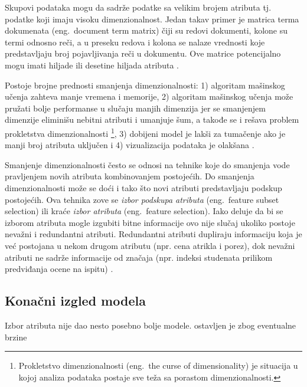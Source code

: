 \documentclass[12pt,oneside]{memoir}
\begin{document}
Skupovi podataka mogu da sadrže podatke sa velikim brojem atributa tj. podatke koji imaju visoku dimenzionalnost. Jedan takav primer je matrica terma dokumenata (eng.~document term matrix) čiji su redovi dokumenti, kolone su termi odnosno reči, a u preseku redova i kolona se nalaze vrednosti koje predstavljaju broj pojavljivanja reči u dokumentu. Ove matrice potencijalno mogu imati hiljade ili desetine hiljada atributa \cite{mitic}. 

Postoje brojne prednosti smanjenja dimenzionalnosti: 1)  algoritam mašinskog učenja zahteva manje vremena i memorije, 2) algoritam mašinskog učenja može pružati bolje performanse u slučaju manjih dimenzija jer se smanjenjem dimenzije eliminišu nebitni atributi i umanjuje šum, a takođe se i rešava problem prokletstva dimenzionalnosti \footnote{Prokletstvo dimenzionalnosti (eng.~the curse of dimensionality) je situacija u kojoj analiza podataka postaje sve teža sa porastom dimenzionalnosti.}, 3) dobijeni model je lakši za tumačenje ako je manji broj atributa uključen i 4) vizualizacija podataka je olakšana \cite{mitic}.

Smanjenje dimenzionalnosti često se odnosi na tehnike koje do smanjenja vode pravljenjem novih atributa kombinovanjem postojećih. Do smanjenja dimenzionalnosti može se doći i tako što novi atributi predstavljaju podskup postojećih. Ova tehnika zove se \textit{izbor podskupa atributa} (eng.~feature subset selection) ili kraće \textit{izbor atributa} (eng.~feature selection). Iako deluje da bi se izborom atributa mogle izgubiti bitne informacije ovo nije slučaj ukoliko postoje nevažni i redundantni atributi. Redundantni atributi dupliraju informaciju koja je već postojana u nekom drugom atributu (npr. cena atrikla i porez), dok nevažni atributi ne sadrže informacije od značaja (npr. indeksi studenata prilikom predviđanja ocene na ispitu) \cite{mitic}. 


\subsection{Konačni izgled modela}

Izbor atributa nije dao nesto posebno bolje modele. ostavljen je zbog eventualne brzine
\end{document}
